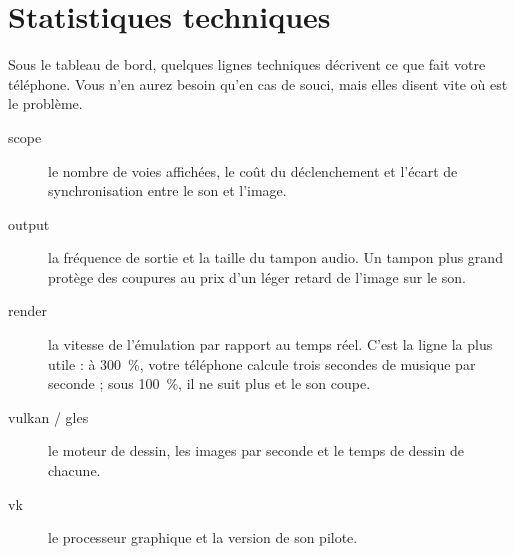 \chapter{Statistiques techniques}
Sous le tableau de bord, quelques lignes techniques décrivent ce que fait votre téléphone. Vous n'en aurez besoin
qu'en cas de souci, mais elles disent vite où est le problème.
\begin{description}
  \item[scope] le nombre de voies affichées, le coût du déclenchement et l'écart de synchronisation entre le son et
        l'image.
  \item[output] la fréquence de sortie et la taille du tampon audio. Un tampon plus grand protège des coupures au
        prix d'un léger retard de l'image sur le son.
  \item[render] la vitesse de l'émulation par rapport au temps réel. C'est la ligne la plus utile : à 300~\%, votre
        téléphone calcule trois secondes de musique par seconde ; sous 100~\%, il ne suit plus et le son coupe.
  \item[vulkan / gles] le moteur de dessin, les images par seconde et le temps de dessin de chacune.
  \item[vk] le processeur graphique et la version de son pilote.
\end{description}
